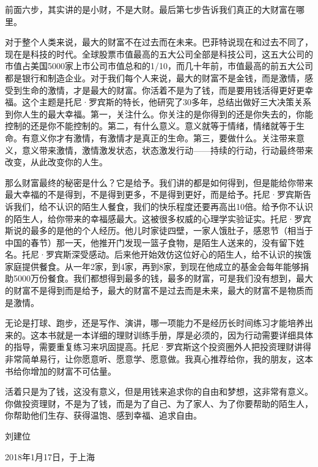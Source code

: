 前面六步，其实讲的是小财，不是大财。最后第七步告诉我们真正的大财富在哪里。

对于整个人类来说，最大的财富不在过去而在未来。巴菲特说现在和过去不同了，现在是科技的时代。全球股票市值最高的五大公司全部是科技公司，这五大公司的市值占美国5000家上市公司市值总和的1/10，而几十年前，市值最高的前五大公司都是银行和制造企业。对于我们每个人来说，最大的财富不是金钱，而是激情，感受到生命的激情，才是最大的财富。你活着不是为了钱，而是要用钱活得更好更幸福。这个主题是托尼·罗宾斯的特长，他研究了30多年，总结出做好三大决策关系到你人生的最大幸福。第一，关注什么。你关注的是你得到的还是你失去的，你能控制的还是你不能控制的。第二，有什么意义。意义就等于情绪，情绪就等于生命。有意义你才有激情，有激情才是真正的生命。第三，要做什么。关注带来意义，意义带来激情，激情激发状态，状态激发行动——持续的行动，行动最终带来改变，从此改变你的人生。

那么财富最终的秘密是什么？它是给予。我们讲的都是如何得到，但是能给你带来最大幸福的不是得到，不是得到更多，不是得到更好，而是给予。托尼·罗宾斯告诉我们，给不认识的陌生人餐食，我们的快乐程度还要再高出10倍。给予你不认识的陌生人，给你带来的幸福感最大。这被很多权威的心理学实验证实。托尼·罗宾斯说的最多的是他的个人经历。他儿时家徒四壁，一家人饿肚子，感恩节（相当于中国的春节）那一天，他推开门发现一篮子食物，是陌生人送来的，没有留下姓名。托尼·罗宾斯深受感动。后来他开始效仿这位好心的陌生人，给不认识的挨饿家庭提供餐食。从一年2家，到4家，再到8家，到现在他成立的基金会每年能够捐助5000万份餐食。我们都想得到最多的钱，最多的财富，可是我们没有想到，最大的财富不是得到而是给予，最大的财富不是过去而是未来，最大的财富不是物质而是激情。

无论是打球、跑步，还是写作、演讲，哪一项能力不是经历长时间练习才能培养出来的。这本书就是一本详细的理财训练手册，厚是必须的，因为行动需要详细具体的指导，需要重复练习来巩固提高。托尼·罗宾斯这个投资圈外人把投资理财讲得非常简单易行，让你愿意听、愿意学、愿意做。我真心推荐给你，我的朋友，这本书给你增加的财富不可估量。

活着只是为了钱，这没有意义，但是用钱来追求你的自由和梦想，这非常有意义。你做投资理财，不是为了钱，而是为了自己、为了家人、为了你要帮助的陌生人，你帮助他们生存、获得温饱、感到幸福、追求自由。

{\kaishu \hfill 刘建位

\hfill 2018年1月17日，于上海}
